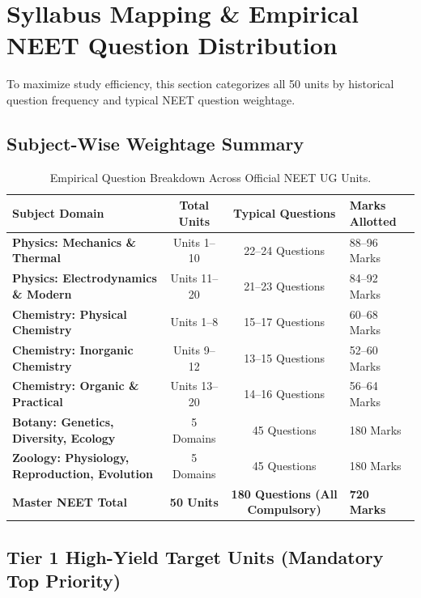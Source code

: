 \documentclass[11pt,a4paper]{article}
\begin{document}
\section{Syllabus Mapping \& Empirical NEET Question Distribution}

To maximize study efficiency, this section categorizes all 50 units by historical question frequency and typical NEET question weightage.

\subsection{Subject-Wise Weightage Summary}

\begin{table}[htbp]
\centering
\small
\renewcommand{\arraystretch}{1.2}
\begin{tabularx}{\textwidth}{L c c Y}
\toprule
\textbf{Subject Domain} & \textbf{Total Units} & \textbf{Typical Questions} & \textbf{Marks Allotted} \\
\midrule
\textbf{Physics: Mechanics \& Thermal} & Units 1--10 & 22--24 Questions & 88--96 Marks \\
\textbf{Physics: Electrodynamics \& Modern} & Units 11--20 & 21--23 Questions & 84--92 Marks \\
\midrule
\textbf{Chemistry: Physical Chemistry} & Units 1--8 & 15--17 Questions & 60--68 Marks \\
\textbf{Chemistry: Inorganic Chemistry} & Units 9--12 & 13--15 Questions & 52--60 Marks \\
\textbf{Chemistry: Organic \& Practical} & Units 13--20 & 14--16 Questions & 56--64 Marks \\
\midrule
\textbf{Botany: Genetics, Diversity, Ecology} & 5 Domains & 45 Questions & 180 Marks \\
\textbf{Zoology: Physiology, Reproduction, Evolution}& 5 Domains & 45 Questions & 180 Marks \\
\midrule
\textbf{Master NEET Total} & \textbf{50 Units} & \textbf{180 Questions (All Compulsory)} & \textbf{720 Marks} \\
\bottomrule
\end{tabularx}
\caption{Empirical Question Breakdown Across Official NEET UG Units.}
\end{table}

\subsection{Tier 1 High-Yield Target Units (Mandatory Top Priority)}
\end{document}
